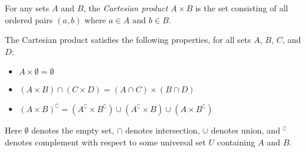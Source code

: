 \documentclass{article}
\begin{document}
For any sets $A$ and $B$, the {\em Cartesian product} $A \times B$ is the set consisting of all ordered pairs $(a,b)$ where $a \in A$ and $b \in B$.

The Cartesian product satisfies the following properties, for all sets $A$, $B$, $C$, and $D$:
\begin{itemize}
\item $A\times \emptyset = \emptyset$
\item $(A \times B) \cap (C \times D) = (A\cap C) \times (B\cap D)$
\item $(A \times B)^\complement = (A^\complement \times B^\complement)
 \cup (A^\complement \times B)
 \cup (A \times B^\complement)$
\end{itemize}

Here $\emptyset$ denotes the empty set, $\cap$ denotes intersection, $\cup$ denotes union, and ${}^\complement$ denotes complement with respect to some universal set $U$ containing $A$ and $B$.
\end{document}
